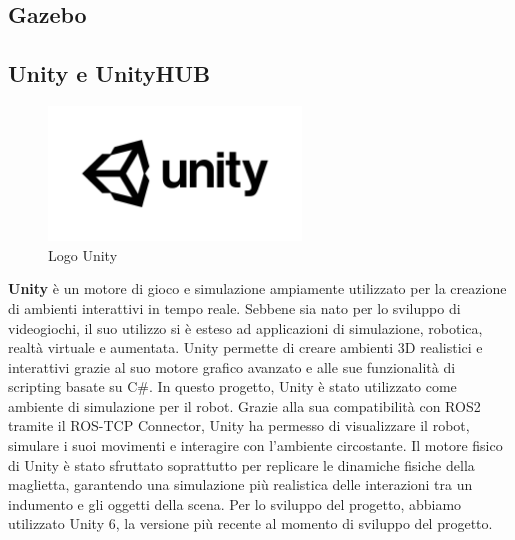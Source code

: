 \documentclass[11pt]{report}
\begin{document}
\subsection{Gazebo}

\subsection{Unity e UnityHUB}

\begin{figure}[H]
    \centering
    \includegraphics[width=0.6\textwidth]{images/UNITY.jpg}
    \caption{Logo Unity}
    \label{fig:UNITY}
\end{figure}

\textbf{Unity} \cite{Unity} è un motore di gioco e simulazione ampiamente utilizzato per la creazione di ambienti interattivi in tempo reale. Sebbene sia nato per lo sviluppo di videogiochi, il suo utilizzo si è esteso ad applicazioni di simulazione, robotica, realtà virtuale e aumentata. Unity permette di creare ambienti 3D realistici e interattivi grazie al suo motore grafico avanzato e alle sue funzionalità di scripting basate su C\#.
In questo progetto, Unity è stato utilizzato come ambiente di simulazione per il robot. Grazie alla sua compatibilità con ROS2 tramite il ROS-TCP Connector, Unity ha permesso di visualizzare il robot, simulare i suoi movimenti e interagire con l'ambiente circostante. Il motore fisico di Unity è stato sfruttato soprattutto per replicare le dinamiche fisiche della maglietta, garantendo una simulazione più realistica delle interazioni tra un indumento e gli oggetti della scena.
Per lo sviluppo del progetto, abbiamo utilizzato Unity 6, la versione più recente al momento di sviluppo del progetto.
\end{document}
